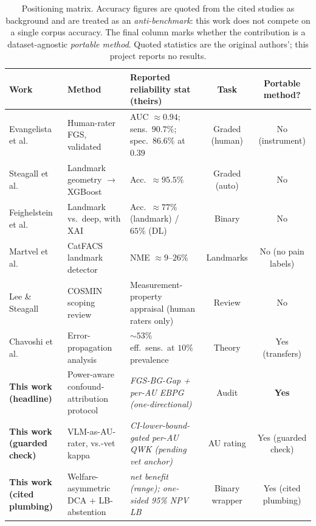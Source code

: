 \begin{table}[t]
  \centering
  \caption[Prior work versus this work positioning matrix]{Positioning matrix.
    Accuracy figures are quoted from the cited studies as background and are
    treated as an \emph{anti-benchmark}: this work does not compete on a single
    corpus accuracy. The final column marks whether the contribution is a
    dataset-agnostic \emph{portable method}. Quoted statistics are the original
    authors'; this project reports no results.}
  \label{tab:positioning}
  \small
  \begin{tabular}{@{}p{3.0cm}p{3.1cm}p{3.3cm}cc@{}}
    \toprule
    \textbf{Work} & \textbf{Method} & \textbf{Reported reliability stat
      (theirs)} & \textbf{Task} & \textbf{Portable method?} \\
    \midrule
    Evangelista et al.\ \cite{evangelista2019}
      & Human-rater FGS, validated
      & AUC $\approx 0.94$; sens.\ $90.7\%$; spec.\ $86.6\%$ at $0.39$
      & Graded (human) & No (instrument) \\
    Steagall et al.\ \cite{steagall2023}
      & Landmark geometry $\to$ XGBoost
      & Acc.\ $\approx 95.5\%$
      & Graded (auto) & No \\
    Feighelstein et al.\ \cite{feighelstein2023}
      & Landmark vs.\ deep, with XAI
      & Acc.\ $\approx 77\%$ (landmark) / $65\%$ (DL)
      & Binary & No \\
    Martvel et al.\ \cite{martvel2024catflw}
      & CatFACS landmark detector
      & NME $\approx 9$--$26\%$
      & Landmarks & No (no pain labels) \\
    Lee \& Steagall \cite{leesteagall2026}
      & COSMIN scoping review
      & Measurement-property appraisal (human raters only)
      & Review & No \\
    Chavoshi et al.\ \cite{chavoshi2025}
      & Error-propagation analysis
      & $\sim 53\%$ eff.\ sens.\ at $10\%$ prevalence
      & Theory & Yes (transfers) \\
    \midrule
    \textbf{This work (headline)}
      & Power-aware confound-attribution protocol
      & \emph{FGS-BG-Gap + per-AU EBPG (one-directional)}
      & Audit & \textbf{Yes} \\
    \textbf{This work (guarded check)}
      & VLM-as-AU-rater, vs.-vet kappa
      & \emph{CI-lower-bound-gated per-AU QWK (pending vet anchor)}
      & AU rating & Yes (guarded check) \\
    \textbf{This work (cited plumbing)}
      & Welfare-asymmetric DCA + LB-abstention
      & \emph{net benefit (range); one-sided 95\% NPV LB}
      & Binary wrapper & Yes (cited plumbing) \\
    \bottomrule
  \end{tabular}
\end{table}

